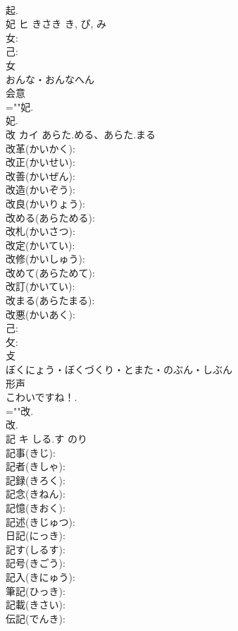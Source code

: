\documentclass[8pt]{extreport}
\begin{document}
\begin{CJK}{UTF8}{min}
\\	起.
\\	妃	ヒ	きさき	き, ぴ, み	
\\	女: 
\\	己: 
\\	女	
\\	おんな・おんなへん	
\\	会意 
\\	=""妃.
\\	妃.
\\	改	カイ	あらた.める、あらた.まる		
\\	改革(かいかく): 
\\	改正(かいせい): 
\\	改善(かいぜん): 
\\	改造(かいぞう): 
\\	改良(かいりょう): 
\\	改める(あらためる): 
\\	改札(かいさつ): 
\\	改定(かいてい): 
\\	改修(かいしゅう): 
\\	改めて(あらためて): 
\\	改訂(かいてい): 
\\	改まる(あらたまる): 
\\	改悪(かいあく): 
\\	己: 
\\	攵: 
\\	攴	
\\	ぼくにょう・ぼくづくり・とまた・のぶん・しぶん	
\\	形声 
\\	こわいですね！.	
\\	=""改.
\\	改.
\\	記	キ	しる.す	のり	
\\	記事(きじ): 
\\	記者(きしゃ): 
\\	記録(きろく): 
\\	記念(きねん): 
\\	記憶(きおく): 
\\	記述(きじゅつ): 
\\	日記(にっき): 
\\	記す(しるす): 
\\	記号(きごう): 
\\	記入(きにゅう): 
\\	筆記(ひっき): 
\\	記載(きさい): 
\\	伝記(でんき): 

\end{CJK}
\end{document}
